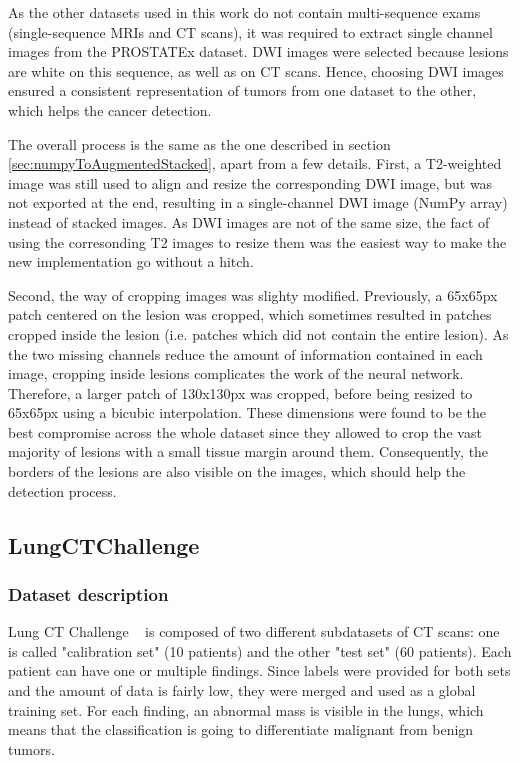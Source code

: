 As the other datasets used in this work do not contain multi-sequence exams (single-sequence MRIs and CT scans), it was required to extract single channel images from the PROSTATEx dataset. DWI images were selected because lesions are white on this sequence, as well as on CT scans. Hence, choosing DWI images ensured a consistent representation of tumors from one dataset to the other, which helps the cancer detection.

The overall process is the same as the one described in section \ref{sec:numpyToAugmentedStacked}, apart from a few details. First, a T2-weighted image was still used to align and resize the corresponding DWI image, but was not exported at the end, resulting in a single-channel DWI image (NumPy array) instead of stacked images. As DWI images are not of the same size, the fact of using the corresonding T2 images to resize them was the easiest way to make the new implementation go without a hitch.

Second, the way of cropping images was slighty modified. Previously, a 65x65px patch centered on the lesion was cropped, which sometimes resulted in patches cropped inside the lesion (i.e. patches which did not contain the entire lesion). As the two missing channels reduce the amount of information contained in each image, cropping inside lesions complicates the work of the neural network. Therefore, a larger patch of 130x130px was cropped, before being resized to 65x65px using a bicubic interpolation. These dimensions were found to be the best compromise across the whole dataset since they allowed to crop the vast majority of lesions with a small tissue margin around them. Consequently, the borders of the lesions are also visible on the images, which should help the detection process. 


\subsection{LungCTChallenge}
\label{sec:lungCTChallenge}
\subsubsection{Dataset description}
\setlength{\marginparwidth}{3cm}\leavevmode {}Lung CT Challenge ~\cite{12, 36, 38} is composed of two different subdatasets of CT scans: one is called "calibration set" (10 patients) and the other "test set" (60 patients). Each patient can have one or multiple findings. Since labels were provided for both sets and the amount of data is fairly low, they were merged and used as a global training set. For each finding, an abnormal mass is visible in the lungs, which means that the classification is going to differentiate malignant from benign tumors. 

